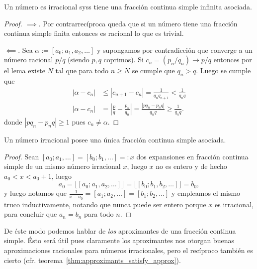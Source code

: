 \documentclass[teoria-numeros.tex]{subfiles}
\begin{document}
\begin{thmi}
	Un número es irracional syss tiene una fracción continua simple infinita asociada.
\end{thmi}
\begin{proof}
	$\implies$. Por contrarrecíproca queda que si un número tiene una fracción continua simple finita entonces es racional lo que es trivial.
	\par
	$\impliedby$.
	Sea $\alpha := [a_0; a_1, a_2, \dots]$ y supongamos por contradicción que converge a un número racional $p/q$ (siendo $p,q$ coprimos).
	Si $c_n = (p_n/q_n) \to p/q$ entonces por el lema existe $N$ tal que para todo $n \ge N$ se cumple que $q_n > q$.
	Luego se cumple que
	\begin{align*}
		| \alpha - c_n | &\le |c_{n+1} - c_n| = \frac{1}{q_nq_{n+1}} < \frac{1}{q_nq} \\
		| \alpha - c_n | &= \left| \frac{p}{q} - \frac{p_n}{q_n} \right| = \frac{|pq_n - p_nq|}{q_nq} \ge \frac{1}{q_nq}.
	\end{align*}
	donde $|pq_n - p_nq| \ge 1$ pues $c_n \ne \alpha$.
\end{proof}

\begin{thm}
	Un número irracional posee una única fracción continua simple asociada.
\end{thm}
\begin{proof}
	Sean $[a_0; a_1, \dots] = [b_0; b_1, \dots] =: x$ dos expansiones en fracción continua simple de un mismo número irracional $x$,
	luego $x$ no es entero y de hecho $a_0 < x < a_0 + 1$, luego
	$$ a_0 = \lfloor [a_0; a_1, a_2, \dots] \rfloor = \lfloor [b_0; b_1, b_2, \dots] \rfloor = b_0, $$
	y luego notamos que $\frac{1}{x - a_0} = [a_1; a_2, \dots] = [b_1; b_2, \dots]$ y empleamos el mismo truco inductivamente,
	notando que nunca puede ser entero porque $x$ es irracional, para concluir que $a_n = b_n$ para todo $n$.
\end{proof}
De éste modo podemos hablar de \textit{los} aproximantes de una fracción continua simple.
Ésto será útil pues claramente los aproximantes nos otorgan buenas aproximaciones racionales para números irracionales,
pero el recíproco también es cierto (cfr. teorema~\ref{thm:approximants_satisfy_approx}).
\end{document}
